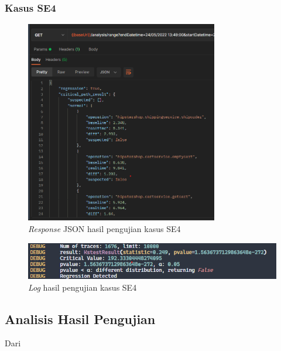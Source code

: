 \subsubsection{Kasus SE4}
\begin{figure}[!htb]
	\centering
	\includegraphics[width=0.75\textwidth]{resources/ch4/json/11.png}
	\caption{\textit{Response} JSON hasil pengujian kasus SE4}
	\label{result_json_9}
\end{figure}

\begin{figure}[!htb]
	\centering
	\includegraphics[width=1\textwidth]{resources/ch4/log/11-log.png}
	\caption{\textit{Log} hasil pengujian kasus SE4}
	\label{result_log_11}
\end{figure}
\pagebreak


\subsection{Analisis Hasil Pengujian}
Dari 
